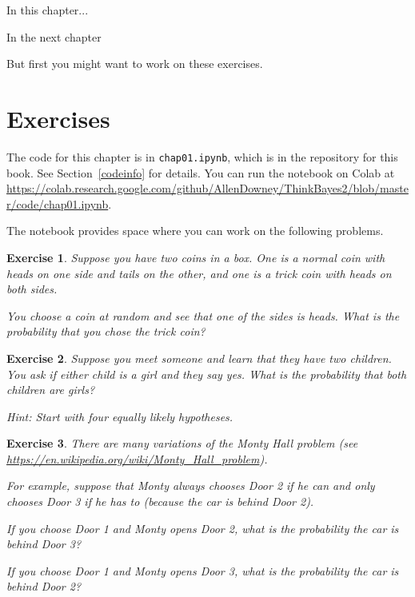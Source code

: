 \documentclass[12pt]{book}
\theoremstyle{exercise}
\newtheorem{exercise}{Exercise}[chapter]
\newcommand{\py}[1]{{\tt #1}}%
\begin{document}
In this chapter...

In the next chapter

But first you might want to work on these exercises.


\section{Exercises}

The code for this chapter is in \py{chap01.ipynb}, which is in the repository for this book.  See Section~\ref{codeinfo} for details.
You can run the notebook on Colab at \url{https://colab.research.google.com/github/AllenDowney/ThinkBayes2/blob/master/code/chap01.ipynb}.

The notebook provides space where you can work on the following problems.

\begin{exercise}

Suppose you have two coins in a box.
One is a normal coin with heads on one side and tails on the other, and one is a trick coin with heads on both sides.

You choose a coin at random and see that one of the sides is heads.
What is the probability that you chose the trick coin?

\end{exercise}


\begin{exercise}

Suppose you meet someone and learn that they have two children.
You ask if either child is a girl and they say yes.
What is the probability that both children are girls?

Hint: Start with four equally likely hypotheses.

\end{exercise}


\begin{exercise}

There are many variations of the Monty Hall problem (see \url{https://en.wikipedia.org/wiki/Monty_Hall_problem}).

For example, suppose that Monty always chooses Door 2 if he can and
only chooses Door 3 if he has to (because the car is behind Door 2).

If you choose Door 1 and Monty opens Door 2, what is the probability the car is behind Door 3?

If you choose Door 1 and Monty opens Door 3, what is the probability the car is behind Door 2?

\end{exercise}
\end{document}
